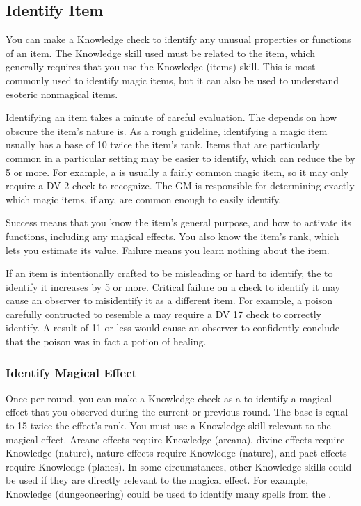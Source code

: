     \subsection{Identify Item}
        You can make a Knowledge check to identify any unusual properties or functions of an item.
        The Knowledge skill used must be related to the item, which generally requires that you use the Knowledge (items) skill.
        This is most commonly used to identify magic items, but it can also be used to understand esoteric nonmagical items.

        Identifying an item takes a minute of careful evaluation.
        The  depends on how obscure the item's nature is.
        As a rough guideline, identifying a magic item usually has a base  of 10 \add twice the item's rank.
        Items that are particularly common in a particular setting may be easier to identify, which can reduce the  by 5 or more.
        For example, a  is usually a fairly common magic item, so it may only require a DV 2 check to recognize.
        The GM is responsible for determining exactly which magic items, if any, are common enough to easily identify.

        Success means that you know the item's general purpose, and how to activate its functions, including any magical effects.
        You also know the item's rank, which lets you estimate its value.
        Failure means you learn nothing about the item.

        If an item is intentionally crafted to be misleading or hard to identify, the  to identify it increases by 5 or more.
        Critical failure on a check to identify it may cause an observer to misidentify it as a different item.
        For example, a poison carefully contructed to resemble a  may require a DV 17 check to correctly identify.
        A result of 11 or less would cause an observer to confidently conclude that the poison was in fact a potion of healing.

    \subsubsection{Identify Magical Effect}
        Once per round, you can make a Knowledge check as a  to identify a magical effect that you observed during the current or previous round.
        The base  is equal to 15 \add twice the effect's rank.
        You must use a Knowledge skill relevant to the magical effect.
        Arcane effects require Knowledge (arcana), divine effects require Knowledge (nature), nature effects require Knowledge (nature), and pact effects require Knowledge (planes).
        In some circumstances, other Knowledge skills could be used if they are directly relevant to the magical effect.
        For example, Knowledge (dungeoneering) could be used to identify many spells from the  .

